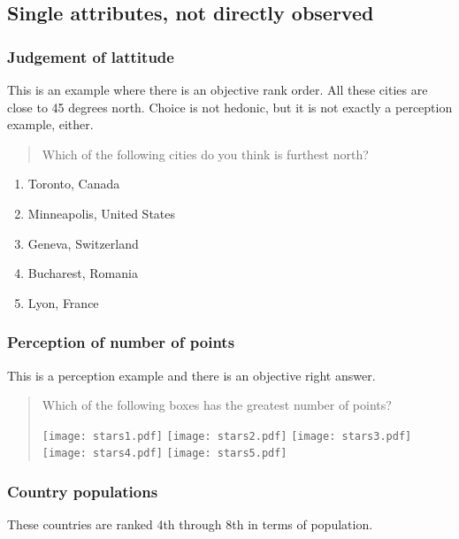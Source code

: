 \documentclass[11pt,letter]{amsart}
\begin{document}
\subsection{Single attributes, not directly observed}

\subsubsection{Judgement of lattitude}

This is an example where there is an objective rank order. All these cities
are close to 45 degrees north. Choice is not hedonic, but it is not exactly
a perception example, either.

\begin{quotation}
Which of the following cities do you think is furthest north?
\end{quotation}

\begin{enumerate}
\item Toronto, Canada 

\item Minneapolis, United States 

\item Geneva, Switzerland 

\item Bucharest, Romania 

\item Lyon, France
\end{enumerate}

\subsubsection{Perception of number of points}

This is a perception example and there is an objective right answer.

\begin{quotation}
Which of the following boxes has the greatest number of points?

\texttt{[image: stars1.pdf]}  %
\texttt{[image: stars2.pdf]}  %
\texttt{[image: stars3.pdf]}  %
\texttt{[image: stars4.pdf]}  %
\texttt{[image: stars5.pdf]}
\end{quotation}

\subsubsection{Country populations}

These countries are ranked 4th through 8th in terms of population.
\end{document}
